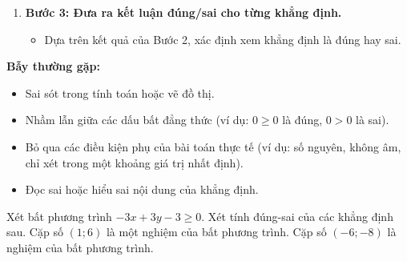 \begin{phuongphap}
\begin{enumerate}
\begin{itemize}
\begin{itemize}
            \item Nếu yêu cầu về số lượng hoặc các điều kiện khác, kiểm tra các điều kiện hoặc tính toán các giá trị cụ thể mà khẳng định đề cập.
        \end{itemize}
    \end{itemize}
    \item \textbf{Bước 3: Đưa ra kết luận đúng/sai cho từng khẳng định.}
    \begin{itemize}
        \item Dựa trên kết quả của Bước 2, xác định xem khẳng định là đúng hay sai.
    \end{itemize}
\end{enumerate}
\textbf{Bẫy thường gặp:}
\begin{itemize}
    \item Sai sót trong tính toán hoặc vẽ đồ thị.
    \item Nhầm lẫn giữa các dấu bất đẳng thức (ví dụ: $0 \ge 0$ là đúng, $0 > 0$ là sai).
    \item Bỏ qua các điều kiện phụ của bài toán thực tế (ví dụ: số nguyên, không âm, chỉ xét trong một khoảng giá trị nhất định).
    \item Đọc sai hoặc hiểu sai nội dung của khẳng định.
\end{itemize}
\end{phuongphap}
\begin{vidumau}
Xét bất phương trình $- 3 x + 3 y - 3\ge 0$. Xét tính đúng-sai của các khẳng định sau.
\choiceTF
{ \True Cặp số $(1; 6)$ là một nghiệm của bất phương trình. }
{ Cặp số $(-6; -8)$ là nghiệm của bất phương trình. }
\end{vidumau}
